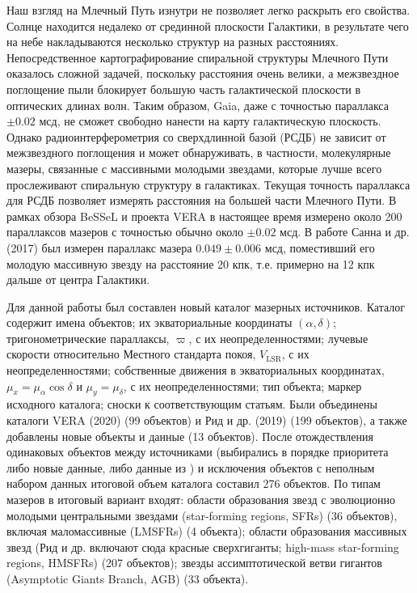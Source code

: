 \documentclass[a4paper, oneside, 14pt]{article}
\begin{document}
Наш взгляд на Млечный Путь изнутри не позволяет легко раскрыть его свойства. Солнце находится недалеко от срединной плоскости Галактики, в результате чего на небе накладываются несколько структур на разных расстояниях. Непосредственное картографирование спиральной структуры Млечного Пути оказалось сложной задачей, поскольку расстояния очень велики, а межзвездное поглощение пыли блокирует большую часть галактической плоскости в оптических длинах волн. Таким образом, Gaia, даже с точностью параллакса $ \pm 0.02 $ мсд, не сможет свободно нанести на карту галактическую плоскость. Однако радиоинтерферометрия со сверхдлинной базой (РСДБ) не зависит от межзвездного поглощения и может обнаруживать, в частности, молекулярные мазеры, связанные с массивными молодыми звездами, которые лучше всего прослеживают спиральную структуру в галактиках. Текущая точность параллакса для РСДБ позволяет измерять расстояния на большей части Млечного Пути. В рамках обзора BeSSeL \cite{BeSSeL} и проекта VERA \cite{VERA.2020} в настоящее время измерено около 200 параллаксов мазеров с точностью обычно около $ \pm 0.02 $ мсд. В работе Санна и др. (2017) \cite{S.2017} был измерен параллакс мазера $ 0.049 \pm 0.006 $ мсд, поместивший его молодую массивную звезду на расстояние 20 кпк, т.е. примерно на 12 кпк дальше от центра Галактики.

Для данной работы был составлен новый каталог мазерных источников. Каталог содержит имена объектов; их экваториальные координаты $ (\alpha, \delta) $; тригонометрические параллаксы, $ \varpi $, с их неопределенностями; лучевые скорости относительно Местного стандарта покоя, $ V_\text{LSR} $, с их неопределенностями; собственные движения в экваториальных координатах, $ \mu_x = \mu_\alpha \cos{\delta} $ и $ \mu_y = \mu_\delta $, с их неопределенностями; тип объекта; маркер исходного каталога; сноски к соответствующим статьям. Были объединены каталоги VERA (2020) \cite{VERA.2020} (99 объектов) и Рид и др. (2019) \cite{R.2019} (199 объектов), а также добавлены новые объекты и данные (13 объектов). После отождествления одинаковых объектов между источниками (выбирались в порядке приоритета либо новые данные, либо данные из \cite{R.2019}) и исключения объектов с неполным набором данных итоговой объем каталога составил 276 объектов. По типам мазеров в итоговый вариант входят: области образования звезд с эволюционно молодыми центральными звездами (star-forming regions, SFRs) (36 объектов), включая маломассивные (LMSFRs) (4 объекта); области образования массивных звезд (Рид и др. включают сюда красные сверхгиганты; high-mass star-forming regions, HMSFRs) (207 объектов); звезды ассимптотической ветви гигантов (Asymptotic Giants Branch, AGB) (33 объекта).
\end{document}
